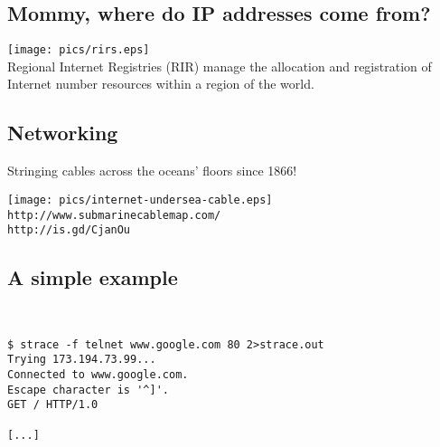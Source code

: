 \documentclass[xga]{xdvislides}
\begin{document}
\subsection{Mommy, where do IP addresses come from?}
\vspace*{\fill}
\begin{center}
	\texttt{[image: pics/rirs.eps]} \\
	\vspace{.5in}
	Regional Internet Registries (RIR) manage the allocation and
registration of Internet number resources within a region of the world.
\end{center}
\vspace*{\fill}

\subsection{Networking}
Stringing cables across the oceans' floors since 1866!
\vspace*{\fill}
\begin{center}
	\texttt{[image: pics/internet-undersea-cable.eps]} \\
	\verb+http://www.submarinecablemap.com/+ \\
	\verb+http://is.gd/CjanOu+
\end{center}
\vspace*{\fill}

\subsection{A simple example}
\\
\Hugesize
\begin{center}
\begin{verbatim}
$ strace -f telnet www.google.com 80 2>strace.out
Trying 173.194.73.99...
Connected to www.google.com.
Escape character is '^]'.
GET / HTTP/1.0

[...]
\end{verbatim}
\end{center}
\Normalsize
\vspace*{\fill}
\end{document}
